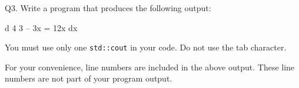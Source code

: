 Q3. Write a program that produces the following output:
\begin{console}[numbers=left]
 d   4      3
-- 3x  = 12x
dx

\end{console}
You must use only one \verb!std::cout! in your code. 
Do not use the tab character. 

For your convenience, line numbers are included in the above output.
These line numbers are not part of your program output.


